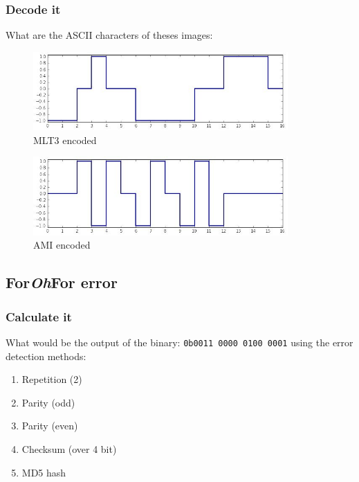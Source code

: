 \documentclass[11pt]{article}
\begin{document}
\subsubsection{Decode it}
What are the ASCII characters of theses images:
  \begin{figure}[h]
    \centering
    \includegraphics[height=3cm]{../slides/imgs/MLT3:).jpg}
    \caption{MLT3 encoded}
    \label{fig:mlt3}
  \end{figure}
  \begin{figure}[h]
    \centering
    \includegraphics[height=3cm]{../slides/imgs/AMI;p.jpg}
    \caption{AMI encoded}
    \label{fig:ami}
  \end{figure}

\subsection{For\emph{Oh}For error}
\subsubsection{Calculate it}
What would be the output of the binary: \verb$0b0011 0000 0100 0001$ using the error detection methods:
  \begin{enumerate}
    \item Repetition (2)         %
    \item Parity (odd)           %
    \item Parity (even)          %
    \item Checksum (over 4 bit)  %
    \item MD5 hash               %
  \end{enumerate}
\end{document}
